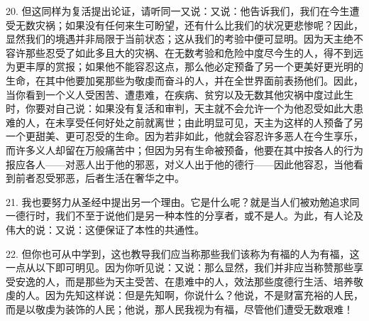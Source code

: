 20. 但这同样为复活提出论证，请听同一又说：\newline{}又说：\newline{}他告诉我们，我们在今生遭受无数灾祸；如果没有任何来生可盼望，还有什么比我们的状况更悲惨呢？因此，显然我们的境遇并非局限于当前状态；这从我们的考验中便可显明。因为天主绝不容许那些忍受了如此多且大的灾祸、在无数考验和危险中度尽今生的人，得不到远为更丰厚的赏报；如果他不能容忍这点，那么他必定预备了另一个更美好更光明的生命，在其中他要加冕那些为敬虔而奋斗的人，并在全世界面前表扬他们。因此，当你看到一个义人受困苦、遭患难，在疾病、贫穷以及无数其他灾祸中度过此生时，你要对自己说：如果没有复活和审判，天主就不会允许一个为他忍受如此大患难的人，在未享受任何好处之前就离世；由此明显可见，天主为这样的人预备了另一个更甜美、更可忍受的生命。因为若非如此，他就会容忍许多恶人在今生享乐，而许多义人却留在万般痛苦中；但因为另有生命被预备，他要在其中按各人的行为报应各人——对恶人出于他的邪恶，对义人出于他的德行——因此他容忍，当他看到前者忍受邪恶，后者生活在奢华之中。\par

21. 我也要努力从圣经中提出另一个理由。它是什么呢？就是当人们被劝勉追求同一德行时，我们不至于说他们是另一种本性的分享者，或不是人。为此，有人论及伟大的说：\newline{}又说：\newline{}这便保证了本性的共通性。\par

22. 但你也可从中学到，这也教导我们应当称那些我们该称为有福的人为有福，这一点从以下即可明见。因为你听见说：\newline{}又说：\newline{}那么显然，我们并非应当称赞那些享受安逸的人，而是那些为天主受苦、在患难中的人，效法那些度德行生活、培养敬虔的人。因为先知这样说：\newline{}但是先知啊，你说什么？他说，不是财富充裕的人民，而是以敬虔为装饰的人民；他说，那人民我视为有福，尽管他们遭受无数艰难！\par

